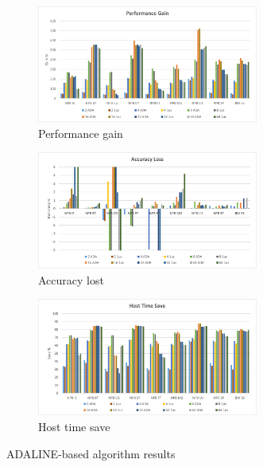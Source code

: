 \begin{figure}[]
\centering
\begin{subfigure}{\textwidth}
    \centering
    \includegraphics[width=0.8\textwidth]{Images/Performance_ADA.png}
    \caption{ Performance gain}
    \label{fig:Performance_ADA}
\end{subfigure}
\begin{subfigure}{\textwidth}
    \centering
    \includegraphics[width=0.8\textwidth]{Images/Accuracy_ADA.png}
    \caption{ Accuracy lost}
    \label{fig:Accuracy_ADA}
\end{subfigure}
\begin{subfigure}{\textwidth}
    \centering
    \includegraphics[width=0.8\textwidth]{Images/Host_ADA.png}
    \caption{ Host time save}
    \label{fig:Host_ADA}
\end{subfigure}
        
\caption{ADALINE-based algorithm results}
\label{fig:results_ADA}
\end{figure}

